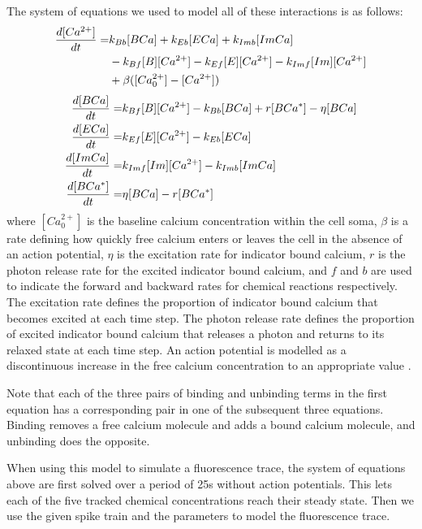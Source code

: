 The system of equations we used to model all of these interactions is as follows:
\begin{equation} \label{eq:model_equations}
  \begin{split}
  \frac{d [Ca^{2+}]}{d t} = & k_{Bb}[BCa] + k_{Eb}[ECa] + k_{Imb}[ImCa] \\
                      & - k_{Bf}[B][Ca^{2+}]- k_{Ef} [E][Ca^{2+}] - k_{Imf}[Im][Ca^{2+}] \\
                      & + \beta ([Ca^{2+}_{0}] - [Ca^{2+}])
  \end{split}
\end{equation}
\begin{align}
  \frac{d [BCa]}{d t} = & k_{Bf}[B][Ca^{2+}] - k_{Bb}[BCa] + r[BCa^{*}] - \eta [BCa] \\
  \frac{d [ECa]}{d t} = & k_{Ef}[E][Ca^{2+}] - k_{Eb}[ECa] \\
  \frac{d [ImCa]}{d t} = & k_{Imf}[Im][Ca^{2+}] - k_{Imb}[ImCa] \\
  \frac{d [BCa^{*}]}{d t} = & \eta[BCa] - r[BCa^{*}]
\end{align}
where $[Ca^{2+}_{0}]$ is the baseline calcium concentration within the cell soma, $\beta$ is a rate defining how quickly free calcium enters or leaves the cell in the absence of an action potential, $\eta$ is the excitation rate for indicator bound calcium, $r$ is the photon release rate for the excited indicator bound calcium, and $f$ and $b$ are used to indicate the forward and backward rates for chemical reactions respectively. The excitation rate defines the proportion of indicator bound calcium that becomes excited at each time step. The photon release rate defines the proportion of excited indicator bound calcium that releases a photon and returns to its relaxed state at each time step. An action potential is modelled as a discontinuous increase in the free calcium concentration to an appropriate value  \parencite{maravall}.

Note that each of the three pairs of binding and unbinding terms in the first equation has a corresponding pair in one of the subsequent three equations. Binding removes a free calcium molecule and adds a bound calcium molecule, and unbinding does the opposite.

When using this model to simulate a fluorescence trace, the system of equations above are first solved over a period of 25s without action potentials. This lets each of the five tracked chemical concentrations reach their steady state. Then we use the given spike train and the parameters to model the fluorescence trace.

